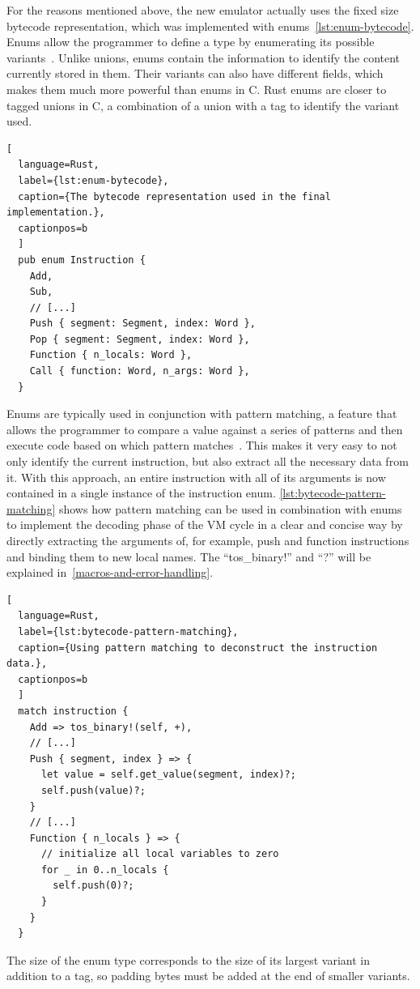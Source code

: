 For the reasons mentioned above, the new emulator actually uses the fixed size bytecode representation, which was implemented with enums~\ref{lst:enum-bytecode}.
Enums allow the programmer to define a type by enumerating its possible variants~\cite[Chapter~6]{klabnik2019rust}.
Unlike unions, enums contain the information to identify the content currently stored in them.
Their variants can also have different fields, which makes them much more powerful than enums in C.
Rust enums are closer to tagged unions in C, a combination of a union with a tag to identify the variant used.
\begin{lstlisting}[
  language=Rust,
  label={lst:enum-bytecode},
  caption={The bytecode representation used in the final implementation.},
  captionpos=b
  ]
  pub enum Instruction {
    Add,
    Sub,
    // [...]
    Push { segment: Segment, index: Word },
    Pop { segment: Segment, index: Word },
    Function { n_locals: Word },
    Call { function: Word, n_args: Word },
  }
\end{lstlisting}
Enums are typically used in conjunction with pattern matching, a feature that allows the programmer to compare a value against a series of patterns and then execute code based on which pattern matches~\cite[Chapter~6.2]{klabnik2019rust}.
This makes it very easy to not only identify the current instruction, but also extract all the necessary data from it.
With this approach, an entire instruction with all of its arguments is now contained in a single instance of the instruction enum.
\cref{lst:bytecode-pattern-matching} shows how pattern matching can be used in combination with enums to implement the decoding phase of the VM cycle in a clear and concise way by directly extracting the arguments of, for example, push and function instructions and binding them to new local names.
The ``tos\_binary!'' and ``?'' will be explained in~\cref{macros-and-error-handling}.
\begin{lstlisting}[
  language=Rust,
  label={lst:bytecode-pattern-matching},
  caption={Using pattern matching to deconstruct the instruction data.},
  captionpos=b
  ]
  match instruction {
    Add => tos_binary!(self, +),
    // [...]
    Push { segment, index } => {
      let value = self.get_value(segment, index)?;
      self.push(value)?;
    }
    // [...]
    Function { n_locals } => {
      // initialize all local variables to zero
      for _ in 0..n_locals {
        self.push(0)?;
      }
    }
  }
\end{lstlisting}
\label{call-instruction}
The size of the enum type corresponds to the size of its largest variant in addition to a tag, so padding bytes must be added at the end of smaller variants.
